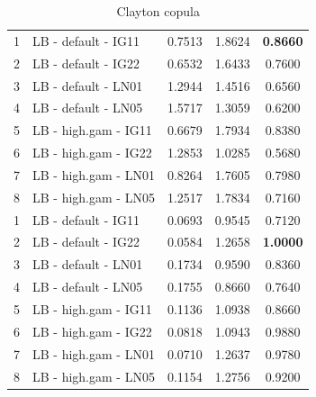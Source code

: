 \documentclass{amsart}
\begin{document}
\begin{table}[ht]
\begin{tabular}{l|l|ccc}
   \midrule
1 & LB - default - IG11 & 0.7513 & 1.8624 & \textbf{0.8660} \\ 
  2 & LB - default - IG22 & 0.6532 & 1.6433 & 0.7600 \\ 
  3 & LB - default - LN01 & 1.2944 & 1.4516 & 0.6560 \\ 
  4 & LB - default - LN05 & 1.5717 & 1.3059 & 0.6200 \\ 
  5 & LB - high.gam - IG11 & 0.6679 & 1.7934 & 0.8380 \\ 
  6 & LB - high.gam - IG22 & 1.2853 & 1.0285 & 0.5680 \\ 
  7 & LB - high.gam - LN01 & 0.8264 & 1.7605 & 0.7980 \\ 
  8 & LB - high.gam - LN05 & 1.2517 & 1.7834 & 0.7160 \\
   \midrule
1 & LB - default - IG11 & 0.0693 & 0.9545 & 0.7120 \\ 
  2 & LB - default - IG22 & 0.0584 & 1.2658 & \textbf{1.0000} \\ 
  3 & LB - default - LN01 & 0.1734 & 0.9590 & 0.8360 \\ 
  4 & LB - default - LN05 & 0.1755 & 0.8660 & 0.7640 \\ 
  5 & LB - high.gam - IG11 & 0.1136 & 1.0938 & 0.8660 \\ 
  6 & LB - high.gam - IG22 & 0.0818 & 1.0943 & 0.9880 \\ 
  7 & LB - high.gam - LN01 & 0.0710 & 1.2637 & 0.9780 \\ 
  8 & LB - high.gam - LN05 & 0.1154 & 1.2756 & 0.9200 \\ 
   \bottomrule
\end{tabular}
\caption{Clayton copula}
\end{table}
\end{document}
